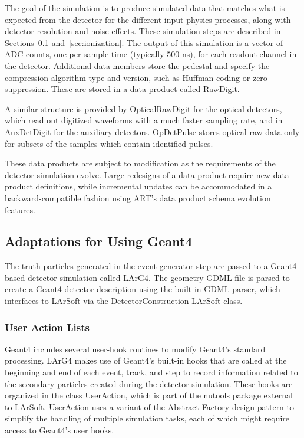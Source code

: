 \documentclass[12pt]{elsarticle}
\begin{document}
The goal of the simulation is to produce simulated data that matches what is expected from the detector for
the different input physics processes, along with detector resolution and noise effects.  These simulation
steps are described in Sections~\ref{sec:adapt} and~\ref{sec:ionization}. The output of this simulation is a vector of ADC counts,
one per sample time (typically 500 ns), for each readout channel in the detector.  Additional data members
store the pedestal and specify the compression algorithm type and version, such as Huffman coding or zero 
suppression. These are stored in a data product called RawDigit.

A similar structure is provided by OpticalRawDigit for the optical detectors, which read out
digitized waveforms with a much faster sampling rate, and in
AuxDetDigit for the auxiliary detectors.  OpDetPulse stores optical raw data only for 
subsets of the samples which contain identified pulses.

These data products are subject to modification as the requirements of the detector simulation evolve.
Large redesigns of a data product require new data product definitions, while
incremental updates can be accommodated in a backward-compatible fashion using ART's
data product schema evolution features.

\subsection{Adaptations for Using Geant4}
\label{sec:adapt}

The truth particles generated in the event generator step are passed to a Geant4 based detector simulation called LArG4.  The geometry GDML file is parsed to create a Geant4 detector description using the built-in GDML parser, which interfaces to LArSoft via the DetectorConstruction LArSoft class.

\subsubsection{User Action Lists}
\label{sec:useractions}
Geant4 includes several user-hook routines to modify Geant4's
standard processing. LArG4 makes use of Geant4's built-in hooks that
are called at the beginning and end of each event, track, and step to
record information related to the secondary particles created during
the detector simulation. These hooks are organized in the class
UserAction, which is part of the nutools package external to
LArSoft. UserAction uses a variant of the Abstract Factory design
pattern \cite{designpatterns} to simplify the handling of multiple
simulation tasks, each of which might require access to Geant4's user
hooks.
\end{document}

